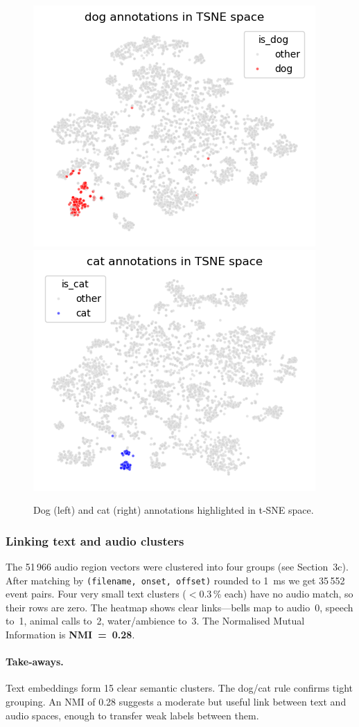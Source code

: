 \documentclass{article}
\begin{document}
\begin{figure}[h]
  \centering
  \includegraphics[width=.42\linewidth]{figs_tang/04_dog_annotations_in_tsne_space.png}\hfill
  \includegraphics[width=.42\linewidth]{figs_tang/04_cat_annotations_in_tsne_space.png}
  \caption{Dog (left) and cat (right) annotations highlighted in t‑SNE space.}
  \label{fig:dogcat_tsne}
\end{figure}

\subsubsection{Linking text and audio clusters}
The 51\,966 audio region vectors were clustered into four groups (see Section~3c). After matching by \texttt{(filename, onset, offset)} rounded to 1 ms we get 35\,552 event pairs. Four very small text clusters ($<0.3$\,\% each) have no audio match, so their rows are zero. The heatmap shows clear links—bells map to audio 0, speech to 1, animal calls to 2, water/ambience to 3. The Normalised Mutual Information is \textbf{NMI = 0.28}.

\paragraph{Take‑aways.} Text embeddings form 15 clear semantic clusters. The dog/cat rule confirms tight grouping. An NMI of 0.28 suggests a moderate but useful link between text and audio spaces, enough to transfer weak labels between them.

\end{document}
